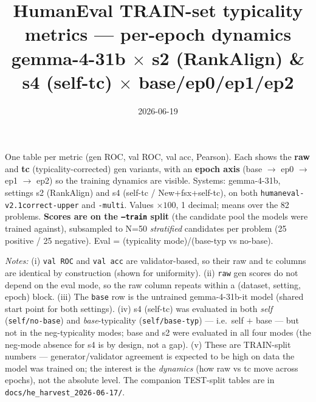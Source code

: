 \documentclass[10pt]{article}
\title{HumanEval TRAIN-set typicality metrics --- per-epoch dynamics\\ \large gemma-4-31b $\times$ s2 (RankAlign) \& s4 (self-tc) $\times$ base/ep0/ep1/ep2}
\author{}
\date{2026-06-19}
\begin{document}
\maketitle

One table per metric (gen ROC, val ROC, val acc, Pearson). Each shows the \textbf{raw} and
\textbf{tc} (typicality-corrected) gen variants, with an \textbf{epoch axis}
(base $\to$ ep0 $\to$ ep1 $\to$ ep2) so the training dynamics are visible. Systems:
gemma-4-31b, settings s2 (RankAlign) and s4 (self-tc / New+fsx+self-tc), on both
\texttt{humaneval-v2.1correct-upper} and \texttt{-multi}. Values $\times 100$, 1 decimal;
means over the 82 problems. \textbf{Scores are on the \texttt{--train} split} (the candidate
pool the models were trained against), subsampled to N=50 \emph{stratified} candidates per
problem (25 positive / 25 negative). Eval = (typicality mode)/(base-typ vs no-base).

\medskip\noindent\textit{Notes:} (i) \texttt{val ROC} and \texttt{val acc} are validator-based,
so their raw and tc columns are identical by construction (shown for uniformity). (ii) \texttt{raw}
gen scores do not depend on the eval mode, so the raw column repeats within a (dataset, setting,
epoch) block. (iii) The \texttt{base} row is the untrained gemma-4-31b-it model (shared start point
for both settings). (iv) s4 (self-tc) was evaluated in both \emph{self} (\texttt{self/no-base})
and \emph{base}-typicality (\texttt{self/base-typ}) --- i.e.\ self $+$ base --- but not in the
neg-typicality modes; base and s2 were evaluated in all four modes (the neg-mode absence for s4
is by design, not a gap). (v) These are
TRAIN-split numbers --- generator/validator agreement is expected to be high on data the model was
trained on; the interest is the \emph{dynamics} (how raw vs tc move across epochs), not the absolute
level. The companion TEST-split tables are in \texttt{docs/he\_harvest\_2026-06-17/}.





\end{document}
